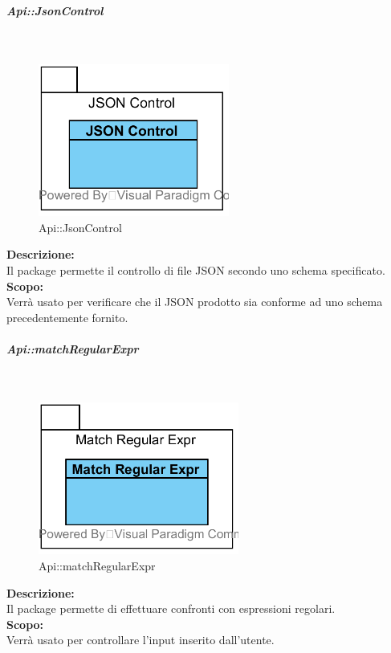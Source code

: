 \begin{samepage}
\subparagraph{Api\-::Json\-Control}\label{api-json}\mbox{}\\
\nopagebreak
\begin{figure}[H]
	\centering
	\includegraphics[height=5cm]{diagrammi_img/classi_e_package/api_json.png}
	\caption{Api\-::Json\-Control}
\end{figure}
\end{samepage}
\textbf{Descrizione:}\\ 
Il package permette il controllo di file JSON secondo uno schema specificato.\\ 
\textbf{Scopo:}\\
Verrà usato per verificare che il JSON prodotto sia conforme ad uno schema precedentemente fornito.

\begin{samepage}
\subparagraph{Api\-::match\-Regular\-Expr}\label{api-regexpr}\mbox{}\\
\nopagebreak
\begin{figure}[H]
	\centering
	\includegraphics[height=5cm]{diagrammi_img/classi_e_package/api_matchex.png}
	\caption{Api\-::match\-Regular\-Expr}
\end{figure}
\end{samepage}
\textbf{Descrizione:}\\ 
Il package permette di effettuare confronti con espressioni regolari.\\ 
\textbf{Scopo:}\\
Verrà usato per controllare l'input inserito dall'utente.

